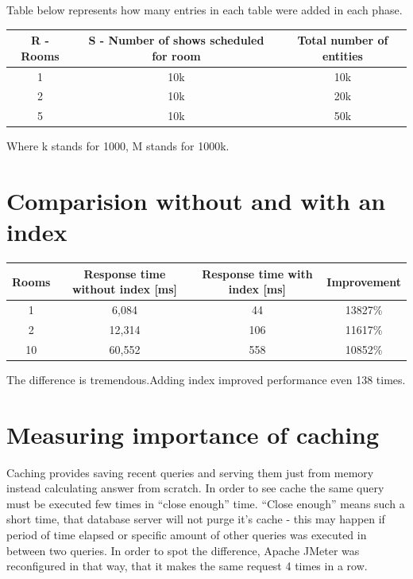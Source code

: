 \documentclass[10pt,a4paper]{article}
\begin{document}
Table below represents how many entries in each table were added in each phase. 
\begin{tabular}{|c|c||c|}
\hline
R - Rooms & 
S - Number of shows scheduled for room & 
Total number of entities \\
\hline
1 &
10k &
10k \\
\hline
2 &
10k &
20k \\
\hline
5 & 
10k & 
50k \\
\hline 
\end{tabular} 
Where k stands for 1000, M stands for 1000k. 

\section{Comparision without and with an index}
\begin{tabular}{|c|c|c|c|}
\hline
Rooms &
Response time without index [ms] &
 Response time with index [ms] &
Improvement \\
\hline
1 &
6,084 &
44 &
13827\% \\
\hline
2 &
12,314 &
106 &
11617\% \\
\hline
10 &
60,552 &
558 &
10852\% \\
\hline
\end{tabular}
The difference is tremendous.Adding index improved performance even 138 times. 
\section{Measuring importance of caching}
Caching provides saving recent queries and serving them just from memory instead calculating answer from scratch. In order to see cache the same query must be executed few times in “close enough” time. “Close enough” means such a short time, that database server will not purge it’s cache - this may happen if period of time elapsed or specific amount of other queries was executed in between two queries. 
    In order to spot the difference, Apache JMeter was reconfigured in that way, that it makes the same request 4 times in a row. 
\end{document}
